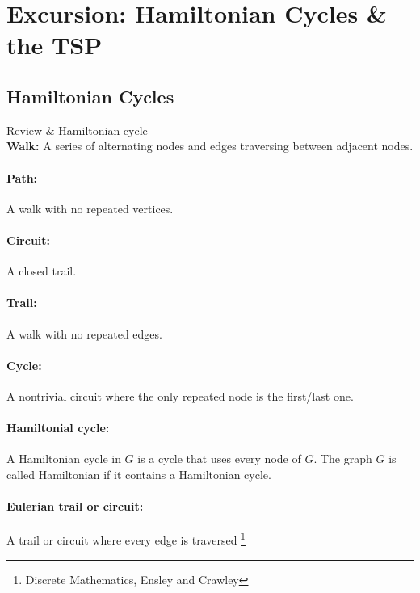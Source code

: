 
\newcommand{\laClass}       {CS 211}
\newcommand{\laSemester}    {Spring 2018}
\newcommand{\laChapter}     {7.7}
\newcommand{\laType}        {Exercise}
\newcommand{\laPoints}      {5}
\newcommand{\laTitle}       {Excursion: Hamiltonian Cycles \& the TSP}
\newcommand{\laDate}        {}
\setcounter{chapter}{7}
\setcounter{section}{7}
\addtocounter{section}{-1}

\toggletrue{answerkey}
\togglefalse{answerkey}





    \section{\laTitle}

    \subsection{Hamiltonian Cycles}

        \begin{intro}{Review \& Hamiltonian cycle} ~\\
            \textbf{Walk:} A series of alternating nodes and edges traversing between adjacent nodes.

            \paragraph{Path:} A walk with no repeated vertices.

            \paragraph{Circuit:} A closed trail.
            
            \paragraph{Trail:} A walk with no repeated edges.
            
            \paragraph{Cycle:} A nontrivial circuit where the only repeated node is the first/last one.
            
            \paragraph{Hamiltonial cycle:} A Hamiltonian cycle in $G$ is a cycle
            that uses every node of $G$. The graph $G$ is called Hamiltonian
            if it contains a Hamiltonian cycle.

            \paragraph{Eulerian trail or circuit:} A trail or circuit where every edge is traversed
            \footnote{Discrete Mathematics, Ensley and Crawley}
        \end{intro}

